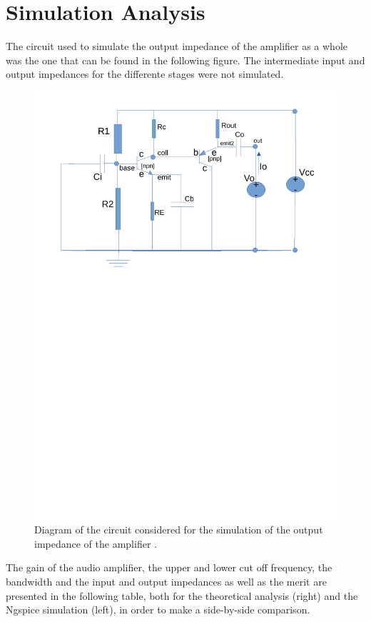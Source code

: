 \section{Simulation Analysis}
\label{sec:simulation}

The circuit used to simulate the output impedance of the amplifier as a whole was the one that can be found in the following figure. The intermediate input and output impedances for the differente stages were not simulated.

\begin{figure}[H] \centering
\includegraphics[width=0.95\linewidth]{diagram_t4_zout.pdf}
\vspace{-10cm}
\caption{Diagram of the circuit considered for the simulation of the output impedance of the amplifier .}
\label{fig:diagram_t4_zout}
\end{figure}


The gain of the audio amplifier, the upper and lower cut off frequency, the bandwidth and the input and output impedances as well as the merit are presented in the following table, both for the theoretical analysis (right) and the Ngspice simulation (left), in order to make a side-by-side comparison.

